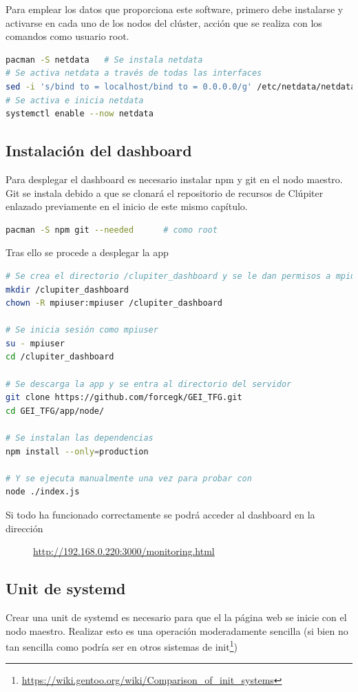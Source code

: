 Para emplear los datos que proporciona este software, primero debe instalarse y activarse en cada uno de los nodos del clúster, acción que se realiza con los comandos como usuario root.

\begin{lstlisting}[language=bash]
pacman -S netdata   # Se instala netdata
# Se activa netdata a través de todas las interfaces
sed -i 's/bind to = localhost/bind to = 0.0.0.0/g' /etc/netdata/netdata.conf
# Se activa e inicia netdata
systemctl enable --now netdata
\end{lstlisting}

\subsection{Instalación del dashboard}
Para desplegar el dashboard es necesario instalar npm y git en el nodo maestro. Git se instala debido a que se clonará el repositorio de recursos de Clúpiter enlazado previamente en el inicio de este mismo capítulo.
\begin{lstlisting}[language=bash]
pacman -S npm git --needed      # como root
\end{lstlisting}

Tras ello se procede a desplegar la app
\begin{lstlisting}[language=bash]
# Se crea el directorio /clupiter_dashboard y se le dan permisos a mpiuser
mkdir /clupiter_dashboard
chown -R mpiuser:mpiuser /clupiter_dashboard

# Se inicia sesión como mpiuser
su - mpiuser
cd /clupiter_dashboard

# Se descarga la app y se entra al directorio del servidor
git clone https://github.com/forcegk/GEI_TFG.git
cd GEI_TFG/app/node/

# Se instalan las dependencias
npm install --only=production

# Y se ejecuta manualmente una vez para probar con
node ./index.js
\end{lstlisting}

Si todo ha funcionado correctamente se podrá acceder al dashboard en la dirección

\begin{figure}[H]
    \vspace{0.2cm}
    \centering
    \url{http://192.168.0.220:3000/monitoring.html}
\end{figure}


\subsection{Unit de systemd}
Crear una unit de systemd es necesario para que el la página web se inicie con el nodo maestro. Realizar esto es una operación moderadamente sencilla (si bien no tan sencilla como podría ser en otros sistemas de init\footnote{\url{https://wiki.gentoo.org/wiki/Comparison_of_init_systems}}) 

